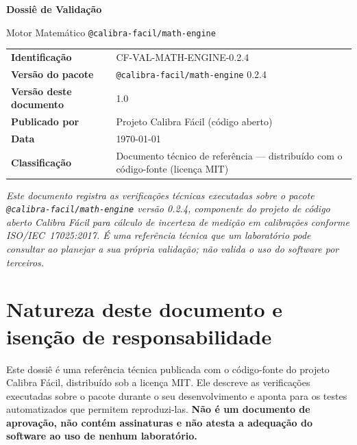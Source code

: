 \documentclass[11pt,a4paper]{article}
\makeatletter
\newcommand{\docTitle}{Dossiê de Validação}
\newcommand{\docSubject}{Motor Matemático \texttt{@calibra-facil/math-engine}}
\newcommand{\docVersion}{0.2.4}
\newcommand{\docId}{CF-VAL-MATH-ENGINE-0.2.4}
\newcommand{\docDate}{\today}
\newcommand{\organizationName}{Projeto Calibra Fácil}
\makeatother
\begin{document}
\begin{titlepage}
  \begin{center}
    \vspace*{1.5cm}
    {\Huge\bfseries \docTitle\par}
    \vspace{0.4cm}
    {\Large \docSubject\par}
    \vspace{2.5cm}
    \begin{tabularx}{0.85\textwidth}{l X}
      \toprule
      \textbf{Identificação} & \docId \\
      \textbf{Versão do pacote} & \texttt{@calibra-facil/math-engine} \docVersion \\
      \textbf{Versão deste documento} & 1.0 \\
      \textbf{Publicado por} & \organizationName{} (código aberto) \\
      \textbf{Data} & \docDate \\
      \textbf{Classificação} & Documento técnico de referência --- distribuído com o código-fonte (licença MIT) \\
      \bottomrule
    \end{tabularx}
    \vfill
    \begin{minipage}{0.85\textwidth}
      \small\itshape
      Este documento registra as verificações técnicas executadas sobre o pacote \texttt{@calibra-facil/math-engine} versão \docVersion{}, componente do projeto de código aberto Calibra Fácil para cálculo de incerteza de medição em calibrações conforme \mbox{ISO/IEC 17025:2017}. É uma referência técnica que um laboratório pode consultar ao planejar a sua própria validação; não valida o uso do software por terceiros.
    \end{minipage}
  \end{center}
\end{titlepage}

\section*{Natureza deste documento e isenção de responsabilidade}

Este dossiê é uma referência técnica publicada com o código-fonte do projeto Calibra Fácil, distribuído sob a licença MIT. Ele descreve as verificações executadas sobre o pacote durante o seu desenvolvimento e aponta para os testes automatizados que permitem reproduzi-las. \textbf{Não é um documento de aprovação, não contém assinaturas e não atesta a adequação do software ao uso de nenhum laboratório.}
\end{document}

